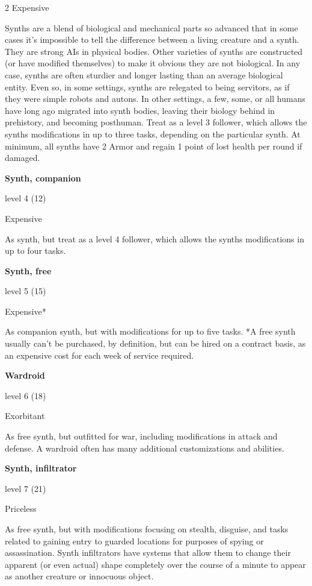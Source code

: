\begin{multicols}{2}
Expensive

Synths are a blend of biological and mechanical parts so advanced that in some cases it’s impossible to tell the difference between a living creature and a synth. They are strong AIs in physical bodies. Other varieties of synths are constructed (or have modified themselves) to make it obvious they are not biological. In any case, synths are often sturdier and longer lasting than an average biological entity. Even so, in some settings, synths are relegated to being servitors, as if they were simple robots and autons. In other settings, a few, some, or all humans have long ago migrated into synth bodies, leaving their biology behind in prehistory, and becoming posthuman. Treat as a level 3 follower, which allows the synths modifications in up to three tasks, depending on the particular synth. At minimum, all synths have 2 Armor and regain 1 point of lost health per round if damaged. 

\textbf{Synth, companion} 

level 4 (12) 

Expensive 

As synth, but treat as a level 4 follower, which allows the synths modifications in up to four tasks. 

\textbf{Synth, free}

level 5 (15) 

Expensive* 

As companion synth, but with modifications for up to five tasks. *A free synth usually can’t be purchased, by definition, but can be hired on a contract basis, as an expensive cost for each week of service required. 

\textbf{Wardroid} 

level 6 (18) 

Exorbitant 

As free synth, but outfitted for war, including modifications in attack and defense. A wardroid often has many additional customizations and abilities. 

\textbf{Synth, infiltrator} 

level 7 (21) 

Priceless 

As free synth, but with modifications focusing on stealth, disguise, and tasks related to gaining entry to guarded locations for purposes of spying or assassination. Synth infiltrators have systems that allow them to change their apparent (or even actual) shape completely over the course of a minute to appear as another creature or innocuous object.


\end{multicols}
